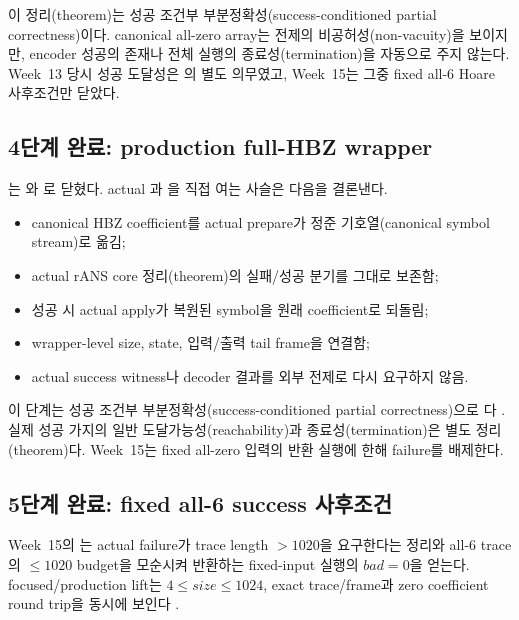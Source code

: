 이 정리(theorem)는 성공 조건부 부분정확성(success-conditioned partial
correctness)이다. canonical all-zero array는 전제의 비공허성(non-vacuity)을
보이지만, encoder 성공의 존재나 전체 실행의 종료성(termination)을 자동으로
주지 않는다. Week~13 당시 성공 도달성은
의 별도 의무였고, Week~15는 그중
fixed all-6 Hoare 사후조건만 닫았다.

\subsection{4단계 완료: production full-HBZ wrapper}

는
와
로 닫혔다. actual
과 을 직접 여는
사슬은 다음을 결론낸다.

\begin{itemize}
  \item canonical HBZ coefficient를 actual prepare가 정준 기호열(canonical
        symbol stream)로 옮김;
  \item actual rANS core 정리(theorem)의 실패/성공 분기를 그대로 보존함;
  \item 성공 시 actual apply가 복원된 symbol을 원래 coefficient로 되돌림;
  \item wrapper-level size, state, 입력/출력 tail frame을 연결함;
  \item actual success witness나 decoder 결과를 외부 전제로 다시 요구하지 않음.
\end{itemize}

이 단계는 성공 조건부 부분정확성(success-conditioned partial correctness)으로
\statusproved 다 \cite{week14-report,hbz-full-wrapper-composition}. 실제 성공
가지의 일반 도달가능성(reachability)과 종료성(termination)은 별도
정리(theorem)다. Week~15는 fixed all-zero 입력의 반환 실행에 한해 failure를
배제한다.

\subsection{5단계 완료: fixed all-6 success 사후조건}

Week~15의 는 actual failure가
trace length \(>1020\)을 요구한다는 정리와 all-6 trace의 \(\le1020\) budget을
모순시켜 반환하는 fixed-input 실행의 \(bad=0\)을 얻는다. focused/production
lift는 \(4\le size\le1024\), exact trace/frame과 zero coefficient round trip을
동시에 보인다 \cite{week15-report,rans-actual-success-witness}.

